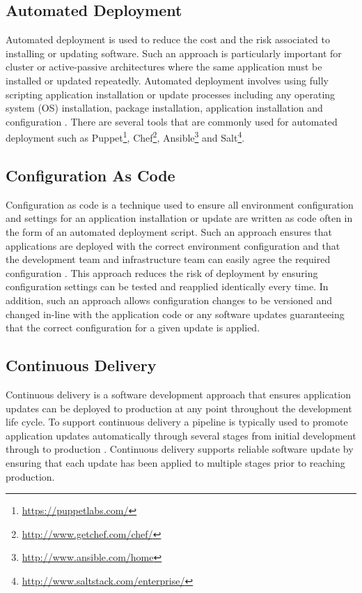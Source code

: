 \documentclass[a4paper,11pt,twoside]{report}
\begin{document}
\subsection{Automated Deployment}
Automated deployment is used to reduce the cost and the risk associated to installing or updating software. Such an approach is particularly important for cluster or active-passive architectures where the same application must be installed or updated repeatedly. Automated deployment involves using fully scripting application installation or update processes including any operating system (OS) installation, package installation, application installation and configuration \cite{Automated}. There are several tools that are commonly used for automated deployment such as Puppet\footnote{\url{https://puppetlabs.com/}}, Chef\footnote{\url{http://www.getchef.com/chef/}}, Ansible\footnote{\url{http://www.ansible.com/home}} and Salt\footnote{\url{http://www.saltstack.com/enterprise/}}.

\subsection{Configuration As Code}
Configuration as code is a technique used to ensure all environment configuration and settings for an application installation or update are written as code often in the form of an automated deployment script. Such an approach ensures that applications are deployed with the correct environment configuration and that the development team and infrastructure team can easily agree the required configuration \cite{Continuous Delivery}. This approach reduces the risk of deployment by ensuring configuration settings can be tested and reapplied identically every time. In addition, such an approach allows configuration changes to be versioned and changed in-line with the application code or any software updates guaranteeing that the correct configuration for a given update is applied.

\subsection{Continuous Delivery}
Continuous delivery is a software development approach that ensures application updates can be deployed to production at any point throughout the development life cycle. To support continuous delivery a pipeline is typically used to promote application updates automatically through several stages from initial development through to production \cite{Continuous Delivery}. Continuous delivery supports reliable software update by ensuring that each update has been applied to multiple stages prior to reaching production. 
\end{document}
